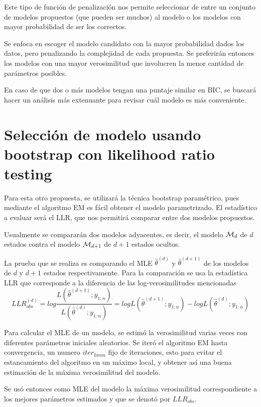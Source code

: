 Este tipo de función de penalización nos permite seleccionar de entre un conjunto de modelos propuestos (que pueden ser muchos) al modelo o los modelos con mayor probabilidad de ser los correctos. 

Se enfoca en escoger el modelo candidato con la mayor probabilidad dados los datos, pero penalizando la complejidad de cada propuesta. Se preferirán entonces los modelos con una mayor verosimilitud que involucren la menor cantidad de parámetros posibles. 

En caso de que dos o más modelos tengan una puntaje similar en \ac{BIC}, se buscará hacer un análisis más extenuante para revisar cuál modelo es más conveniente.

\section{Selección de modelo usando bootstrap con likelihood ratio testing}

Para esta otro propuesta, se utilizará la técnica bootstrap paramétrico, pues mediante el algoritmo \ac{EM} es fácil obtener el modelo parametrizado. El estadístico a evaluar será el \ac{LLR}, que nos permitirá comparar entre dos modelos propuestos. 

Usualmente se compararán dos modelos adyacentes, es decir, el modelo $\mathcal{M}_d$ de $d$ estados contra el modelo $\mathcal{M}_{d+1}$ de $d+1$ estados ocultos.

La prueba que se realiza es comparando el \ac{MLE} $\hat \theta^{(d)}$ y $\hat \theta^{(d+1)}$ de los modelos de $d$ y $d+1$ estados respectivamente. Para la comparación se usa la estadística \ac{LLR} que corresponde a la diferencia de las log-verosimilitudes mencionadas
\begin{equation}
  LLR^{(d)}_{obs} = log \frac{L(\hat \theta^{(d+1)}; y_{1:n})}{L(\hat \theta^{(d)}; y_{1:n})} =
    log L(\hat \theta^{(d+1)}; y_{1:n}) - 
    log L(\hat \theta^{(d)}; y_{1:n})
\end{equation}

Para calcular el \ac{MLE} de un modelo, se estimó la verosimilitud varias veces con diferentes parámetros iniciales aleatorios. Se iteró el algoritmo \ac{EM} hasta convergencia, un numero $iter_{hmm}$ fijo de iteraciones, esto para evitar el estancamiento del algoritmo en un máximo local, y obtener así una buena estimación de la máxima verosimilitud del modelo.

Se usó entonces como \ac{MLE} del modelo la máxima verosimilitud correspondiente a los mejores parámetros estimados y que se denotó por $LLR_{obs}$.

